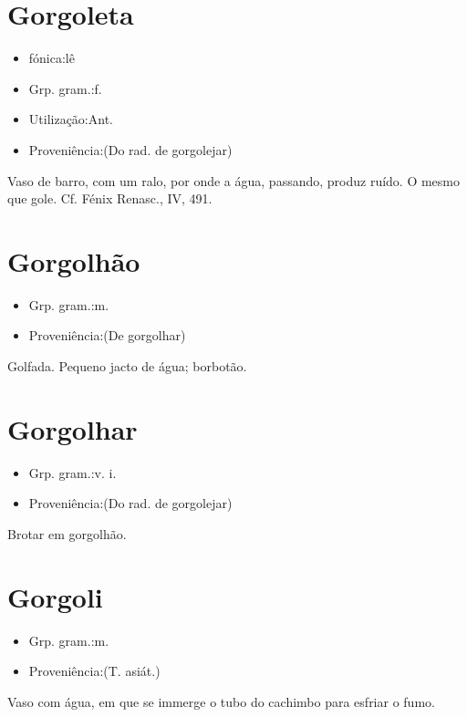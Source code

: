 \section{Gorgoleta}
\begin{itemize}
\item {fónica:lê}
\end{itemize}
\begin{itemize}
\item {Grp. gram.:f.}
\end{itemize}
\begin{itemize}
\item {Utilização:Ant.}
\end{itemize}
\begin{itemize}
\item {Proveniência:(Do rad. de \textunderscore gorgolejar\textunderscore )}
\end{itemize}
Vaso de barro, com um ralo, por onde a água, passando, produz ruído.
O mesmo que \textunderscore gole\textunderscore . Cf. \textunderscore Fénix Renasc.\textunderscore , IV, 491.
\section{Gorgolhão}
\begin{itemize}
\item {Grp. gram.:m.}
\end{itemize}
\begin{itemize}
\item {Proveniência:(De \textunderscore gorgolhar\textunderscore )}
\end{itemize}
Golfada.
Pequeno jacto de água; borbotão.
\section{Gorgolhar}
\begin{itemize}
\item {Grp. gram.:v. i.}
\end{itemize}
\begin{itemize}
\item {Proveniência:(Do rad. de \textunderscore gorgolejar\textunderscore )}
\end{itemize}
Brotar em gorgolhão.
\section{Gorgoli}
\begin{itemize}
\item {Grp. gram.:m.}
\end{itemize}
\begin{itemize}
\item {Proveniência:(T. asiát.)}
\end{itemize}
Vaso com água, em que se immerge o tubo do cachimbo para esfriar o fumo.
